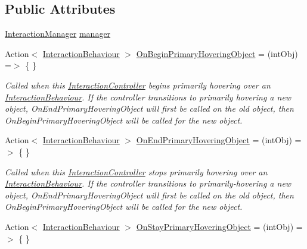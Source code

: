 \subsection*{Public Attributes}
\begin{DoxyCompactItemize}
\item 
\mbox{\hyperlink{class_leap_1_1_unity_1_1_interaction_1_1_interaction_manager}{Interaction\+Manager}} \mbox{\hyperlink{class_leap_1_1_unity_1_1_interaction_1_1_interaction_controller_a9e906a87460175737227bd0f42bebdce}{manager}}
\item 
Action$<$ \mbox{\hyperlink{class_leap_1_1_unity_1_1_interaction_1_1_interaction_behaviour}{Interaction\+Behaviour}} $>$ \mbox{\hyperlink{class_leap_1_1_unity_1_1_interaction_1_1_interaction_controller_a650dbb36420d01848fe0103dd927f84c}{On\+Begin\+Primary\+Hovering\+Object}} = (int\+Obj) =$>$ \{ \}
\begin{DoxyCompactList}\small\item\em Called when this \mbox{\hyperlink{class_leap_1_1_unity_1_1_interaction_1_1_interaction_controller}{Interaction\+Controller}} begins primarily hovering over an \mbox{\hyperlink{class_leap_1_1_unity_1_1_interaction_1_1_interaction_behaviour}{Interaction\+Behaviour}}. If the controller transitions to primarily hovering a new object, On\+End\+Primary\+Hovering\+Object will first be called on the old object, then On\+Begin\+Primary\+Hovering\+Object will be called for the new object. \end{DoxyCompactList}\item 
Action$<$ \mbox{\hyperlink{class_leap_1_1_unity_1_1_interaction_1_1_interaction_behaviour}{Interaction\+Behaviour}} $>$ \mbox{\hyperlink{class_leap_1_1_unity_1_1_interaction_1_1_interaction_controller_a5f8e8be344906d62743703848f2f20bb}{On\+End\+Primary\+Hovering\+Object}} = (int\+Obj) =$>$ \{ \}
\begin{DoxyCompactList}\small\item\em Called when this \mbox{\hyperlink{class_leap_1_1_unity_1_1_interaction_1_1_interaction_controller}{Interaction\+Controller}} stops primarily hovering over an \mbox{\hyperlink{class_leap_1_1_unity_1_1_interaction_1_1_interaction_behaviour}{Interaction\+Behaviour}}. If the controller transitions to primarily-\/hovering a new object, On\+End\+Primary\+Hovering\+Object will first be called on the old object, then On\+Begin\+Primary\+Hovering\+Object will be called for the new object. \end{DoxyCompactList}\item 
Action$<$ \mbox{\hyperlink{class_leap_1_1_unity_1_1_interaction_1_1_interaction_behaviour}{Interaction\+Behaviour}} $>$ \mbox{\hyperlink{class_leap_1_1_unity_1_1_interaction_1_1_interaction_controller_ada639d7fe85125f34caa98faabe131c2}{On\+Stay\+Primary\+Hovering\+Object}} = (int\+Obj) =$>$ \{ \}

\end{DoxyCompactItemize}
